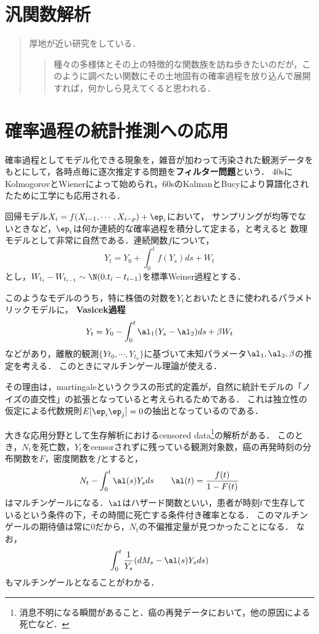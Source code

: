 \documentclass[uplatex,dvipdfmx]{jsreport}
\begin{document}
\section{汎関数解析}

\begin{quotation}
    厚地\cite{厚地}が近い研究をしている．
    \begin{quote}
        種々の多様体とその上の特徴的な関数族を訪ね歩きたいのだが，このように調べたい関数にその土地固有の確率過程を放り込んで展開すれば，何かしら見えてくると思われる．
    \end{quote}
\end{quotation}

\section{確率過程の統計推測への応用}

\begin{history}
    確率過程としてモデル化できる現象を，雑音が加わって汚染された観測データをもとにして，各時点毎に逐次推定する問題を\textbf{フィルター問題}という．
    40sにKolmogorovとWienerによって始められ，60sのKalmanとBucyにより算譜化されたために工学にも応用される．
\end{history}

\begin{example}
    回帰モデル$X_i=f(X_{i-1},\cdots,X_{i-p})+\ep_i$において，
    サンプリングが均等でないときなど，$\ep_i$は何か連続的な確率過程を積分して定まる，と考えると
    数理モデルとして非常に自然である．連続関数$f$について，
    \[Y_t=Y_0+\int^t_0f(Y_s)ds+W_t\]
    とし，$W_{t_i}-W_{t_{i-1}}\sim\N(0.t_i-t_{i-1})$を標準Weiner過程とする．

    このようなモデルのうち，特に株価の対数を$Y_t$とおいたときに使われるパラメトリックモデルに，
    \textbf{Vasicek過程}
    \[Y_t=Y_0-\int^t_0\al_1(Y_s-\al_2)ds+\beta W_t\]
    などがあり，離散的観測$\{Y{t_0},\cdots,Y_{t_n}\}$に基づいて未知パラメータ$\al_1,\al_2,\beta$の推定を考える．
    このときにマルチンゲール理論が使える．

    その理由は，martingaleというクラスの形式的定義が，自然に統計モデルの「ノイズの直交性」の拡張となっていると考えられるためである．
    これは独立性の仮定による代数規則$E[\ep_i\ep_j]=0$の抽出となっているのである．

    大きな応用分野として生存解析におけるcensored data\footnote{消息不明になる瞬間があること．癌の再発データにおいて，他の原因による死亡など．}の解析がある．
    このとき，$N_t$を死亡数，$Y_t$をcensorされずに残っている観測対象数，癌の再発時刻の分布関数を$F$，密度関数を$f$とすると，
    \[N_t-\int^t_0\al(s)Y_sds\qquad\al(t)=\frac{f(t)}{1-F(t)}\]
    はマルチンゲールになる．$\al$はハザード関数といい，患者が時刻$t$で生存しているという条件の下，その時間に死亡する条件付き確率となる．
    このマルチンゲールの期待値は常に$0$だから，$N_t$の不偏推定量が見つかったことになる．
    なお，
    \[\int^t_0\frac{1}{Y_s}(dM_s-\al(s)Y_sds)\]
    もマルチンゲールとなることがわかる．
\end{example}
\end{document}
